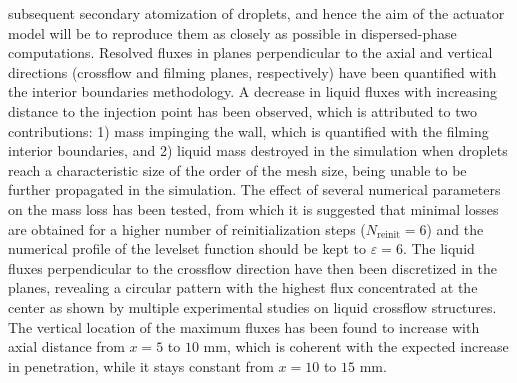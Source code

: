 subsequent secondary atomization of droplets, and hence the aim of the actuator model will be to reproduce them as closely as possible in dispersed-phase computations. Resolved fluxes in planes perpendicular to the axial and vertical directions (crossflow and filming planes, respectively) have been quantified with the interior boundaries methodology. A decrease in liquid fluxes with increasing distance to the injection point has been observed, which is attributed to two contributions: 1) mass impinging the wall, which is quantified with the filming interior boundaries, and 2) liquid mass destroyed in the simulation when droplets reach a characteristic size of the order of the mesh size, being unable to be further propagated in the simulation. The effect of several numerical parameters on the mass loss has been tested, from which it is suggested that minimal losses are obtained for a higher number of reinitialization steps ($N_\mathrm{reinit} = 6$) and the numerical profile of the levelset function should be kept to $\varepsilon = 6$. The liquid fluxes perpendicular to the crossflow direction have then been discretized in the planes, revealing a circular pattern with the highest flux concentrated at the center as shown by multiple experimental studies on liquid crossflow structures. The vertical location of the maximum fluxes has been found to increase with axial distance from $x =5$ to $10$ mm, which is coherent with the expected increase in penetration, while it stays constant from $x = 10$ to $15$ mm.

